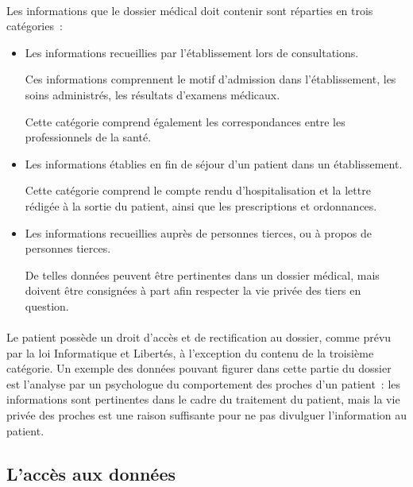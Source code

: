 \paragraph{}
Les informations que le dossier médical doit contenir sont réparties en
trois catégories~:

\begin{itemize}
    \item Les informations recueillies par l'établissement lors de
        consultations.

        Ces informations comprennent le motif d'admission dans l'établissement,
        les soins administrés, les résultats d'examens médicaux.

        Cette catégorie comprend également les correspondances entre les
        professionnels de la santé.

    \item Les informations établies en fin de séjour d'un patient dans un
        établissement.

        Cette catégorie comprend le compte rendu d'hospitalisation et la lettre
        rédigée à la sortie du patient, ainsi que les prescriptions et ordonnances.

    \item Les informations recueillies auprès de personnes tierces, ou à propos
        de personnes tierces.

        De telles données peuvent être pertinentes dans un dossier médical, mais
        doivent être consignées à part afin respecter la vie privée des tiers en
        question.
\end{itemize}

\paragraph{}
Le patient possède un droit d'accès et de rectification au dossier, comme prévu
par la loi Informatique et Libertés, à l'exception du contenu de la troisième
catégorie. Un exemple des données pouvant figurer dans cette partie du dossier
est l'analyse par un psychologue du comportement des proches d'un
patient~: les informations sont pertinentes dans le cadre du traitement du
patient, mais la vie privée des proches est une raison suffisante pour ne pas
divulguer l'information au patient.


        \subsection{L'accès aux données}

